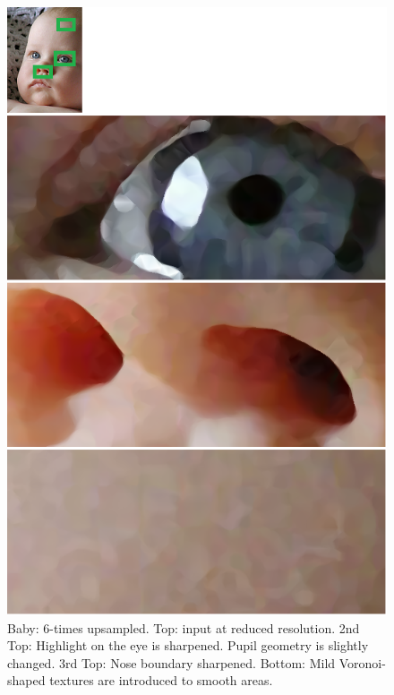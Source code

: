 \begin{figure}[htbp]\centering
\includegraphics{imagesPM/f7.png}
\caption{Baby: 6-times upsampled. Top: input at reduced resolution. 2nd Top: Highlight on the eye is sharpened. Pupil geometry is slightly changed. 3rd Top: Nose boundary sharpened. Bottom: Mild Voronoi-shaped textures are introduced to smooth areas.}
\label{fig:genBaby}
\end{figure}

